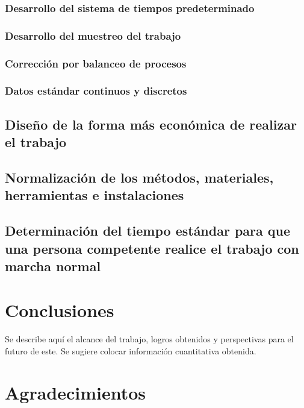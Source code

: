     \subsubsection{Desarrollo del sistema de tiempos predeterminado}
    \subsubsection{Desarrollo del muestreo del trabajo}
    \subsubsection{Corrección por balanceo de procesos}
    \subsubsection{Datos estándar continuos y discretos}
    \subsection{Diseño de la forma más económica de realizar el trabajo}
    
    \subsection{Normalización de los métodos, materiales, herramientas e instalaciones}
    
    \subsection{Determinación del tiempo estándar para que una persona competente realice el trabajo con marcha normal}
    
    
    \section{Conclusiones}
    
    Se describe aquí el alcance del trabajo, logros obtenidos y perspectivas para el futuro de este. Se sugiere colocar información cuantitativa obtenida.
    
    \section{Agradecimientos}
    
